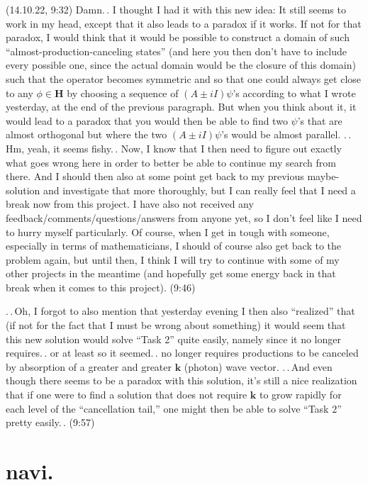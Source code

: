 \documentclass{report}
\begin{document}
(14.10.22, 9:32) Damn.\,. I thought I had it with this new idea: It still seems to work in my head, except that it also leads to a paradox if it works. If not for that paradox, I would think that it would be possible to construct a domain of such ``almost-production-canceling states'' (and here you then don't have to include every possible one, since the actual domain would be the closure of this domain) such that the operator becomes symmetric and so that one could always get close to any $\phi \in \mathbf{H}$ by choosing a sequence of $(A \pm i I)\psi$'s according to what I wrote yesterday, at the end of the previous paragraph. But when you think about it, it would lead to a paradox that you would then be able to find two $\psi$'s that are almost orthogonal but where the two $(A \pm i I)\psi$'s would be almost parallel. .\,.\,Hm, yeah, it seems fishy.\,. Now, I know that I then need to figure out exactly what goes wrong here in order to better be able to continue my search from there. And I should then also at some point get back to my previous maybe-solution and investigate that more thoroughly, but I can really feel that I need a break now from this project. I have also not received any feedback/comments/questions/answers from anyone yet, so I don't feel like I need to hurry myself particularly. Of course, when I get in tough with someone, especially in terms of mathematicians, I should of course also get back to the problem again, but until then, I think I will try to continue with some of my other projects in the meantime (and hopefully get some energy back in that break when it comes to this project). (9:46)

.\,.\,Oh, I forgot to also mention that yesterday evening I then also ``realized'' that (if not for the fact that I must be wrong about something) it would seem that this new solution would solve ``Task 2'' quite easily, namely since it no longer requires.\,. or at least so it seemed.\,. no longer requires productions to be canceled by absorption of a greater and greater $\mathbf{k}$ (photon) wave vector. .\,.\,And even though there seems to be a paradox with this solution, it's still a nice realization that if one were to find a solution that does not require $\mathbf{k}$ to grow rapidly for each level of the ``cancellation tail,'' one might then be able to solve ``Task 2'' pretty easily.\,. (9:57)


\newpage
\section*{navi.}































\newpage
\ 
\end{document}
